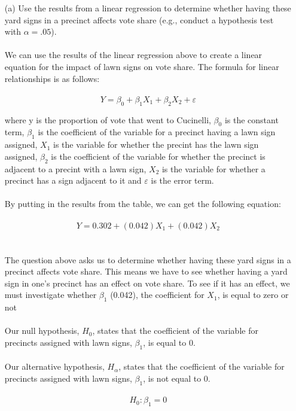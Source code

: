 \documentclass[12pt,letterpaper]{article}
\begin{document}
\vspace{.5cm}
\begin{enumerate}
\newpage
	\item [(a)] Use the results from a linear regression to determine whether having these yard signs in a precinct affects vote share (e.g., conduct a hypothesis test with $\alpha = .05$).
\\\\	
\noindent We can use the results of the linear regression above to create a linear equation for the impact of lawn signs on vote share. The formula for linear relationships is as follows:
\\\\
\[Y = \beta_0 + \beta_1X_1 + \beta_2X_2 + \varepsilon \]	

\noindent where y is the proportion of vote that went to Cucinelli, $\beta_0$ is the constant term, $\beta_1$ is the coefficient of the variable for a precinct having a lawn sign assigned, $X_1$ is the variable for whether the precint has the lawn sign assigned, $\beta_2$ is the coefficient of the variable for whether the precinct is adjacent to a precint with a lawn sign, $X_2$ is the variable for whether a precinct has a sign adjacent to it and $\varepsilon$ is the error term.
\\\\
\noindent By putting in the results from the table, we can get the following equation:
\\\\
\[Y = 0.302 + (0.042)X_1 + (0.042)X_2\]
\\\\
\noindent The question above asks us to determine whether having these yard signs in a precinct affects vote share. This means we have to see whether having a yard sign in one's 
precinct has an effect on vote share. To see if it has an effect, we must investigate whether $\beta_1$ (0.042), the coefficient for $X_1$, is equal to zero or not
\\\\
\noindent Our null hypothesis, $H_0$, states that the coefficient of the variable for precincts assigned with lawn signs, $\beta_1$, is equal to 0.
\\\\
\noindent Our alternative hypothesis, $H_\alpha$, states that the coefficient of the variable for precincts assigned with lawn signs, $\beta_1$, is not equal to 0.
\\\\
\[H_0:\beta_1 = 0\]

\end{enumerate}
\end{document}
